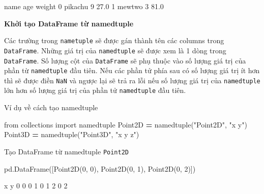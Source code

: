 \documentclass[
]{book}
\newenvironment{Shaded}{\begin{snugshade}}{\end{snugshade}}
\newcommand{\DecValTok}[1]{\textcolor[rgb]{0.00,0.00,0.81}{#1}}
\newcommand{\FloatTok}[1]{\textcolor[rgb]{0.00,0.00,0.81}{#1}}
\newcommand{\ImportTok}[1]{#1}
\newcommand{\NormalTok}[1]{#1}
\newcommand{\OperatorTok}[1]{\textcolor[rgb]{0.81,0.36,0.00}{\textbf{#1}}}
\newcommand{\StringTok}[1]{\textcolor[rgb]{0.31,0.60,0.02}{#1}}
\begin{document}
\begin{Shaded}
\begin{Highlighting}[]
\NormalTok{       name  age  weight}
\DecValTok{0}\NormalTok{   pikachu    }\DecValTok{9}    \FloatTok{27.0}
\DecValTok{1}\NormalTok{    mewtwo    }\DecValTok{3}    \FloatTok{81.0}
\end{Highlighting}
\end{Shaded}

\textbf{Khởi tạo DataFrame từ namedtuple}

Các trường trong \texttt{nametuple} sẽ được gán thành tên các columns trong \texttt{DataFrame}. Những giá trị của \texttt{namedtuple} sẽ được xem là 1 dòng trong \texttt{DataFrame}.
Số lượng cột của \texttt{DataFrame} sẽ phụ thuộc vào số lượng giá trị của phần từ \texttt{namedtuple} đầu tiên. Nếu các phần tử phía sau có số lượng giá trị ít hơn thì
sẽ được điền \texttt{NaN} và ngược lại sẽ trả ra lỗi nếu số lượng giá trị của \texttt{namedtuple} lớn hơn số lượng giá trị của phần tử \texttt{namedtuple} đầu tiên.

Ví dụ về cách tạo namedtuple

\begin{Shaded}
\begin{Highlighting}[]
\ImportTok{from}\NormalTok{ collections }\ImportTok{import}\NormalTok{ namedtuple}
\NormalTok{Point2D }\OperatorTok{=}\NormalTok{ namedtuple(}\StringTok{"Point2D"}\NormalTok{, }\StringTok{"x y"}\NormalTok{)}
\NormalTok{Point3D }\OperatorTok{=}\NormalTok{ namedtuple(}\StringTok{"Point3D"}\NormalTok{, }\StringTok{"x y z"}\NormalTok{)}
\end{Highlighting}
\end{Shaded}

Tạo DataFrame từ namedtuple \texttt{Point2D}

\begin{Shaded}
\begin{Highlighting}[]
\NormalTok{pd.DataFrame([Point2D(}\DecValTok{0}\NormalTok{, }\DecValTok{0}\NormalTok{), Point2D(}\DecValTok{0}\NormalTok{, }\DecValTok{1}\NormalTok{), Point2D(}\DecValTok{0}\NormalTok{, }\DecValTok{2}\NormalTok{)])}
\end{Highlighting}
\end{Shaded}

\begin{Shaded}
\begin{Highlighting}[]
\NormalTok{   x  y}
\DecValTok{0}  \DecValTok{0}  \DecValTok{0}
\DecValTok{1}  \DecValTok{0}  \DecValTok{1}
\DecValTok{2}  \DecValTok{0}  \DecValTok{2}
\end{Highlighting}
\end{Shaded}
\end{document}
